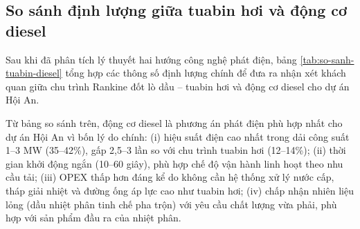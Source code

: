 \documentclass[../main.tex]{subfiles}
\begin{document}
\subsection{So sánh định lượng giữa tuabin hơi và động cơ diesel}
\label{sec:so-sanh-phat-dien}

Sau khi đã phân tích lý thuyết hai hướng công nghệ phát điện, bảng \ref{tab:so-sanh-tuabin-diesel} tổng hợp các thông số định lượng chính để đưa ra nhận xét khách quan giữa chu trình Rankine đốt lò dầu -- tuabin hơi và động cơ diesel cho dự án Hội An.

\begin{table}[H]
\centering
\caption{So sánh định lượng giữa đốt lò dầu -- tuabin hơi và động cơ diesel cho dự án xử lý CTRSH Hội An}
\label{tab:so-sanh-tuabin-diesel}
\setlength{\tabcolsep}{4pt}
\end{table}

Từ bảng so sánh trên, động cơ diesel là phương án phát điện phù hợp nhất cho dự án Hội An vì bốn lý do chính: (i) hiệu suất điện cao nhất trong dải công suất 1--3 MW (35--42\%), gấp 2,5--3 lần so với chu trình tuabin hơi (12--14\%); (ii) thời gian khởi động ngắn (10--60 giây), phù hợp chế độ vận hành linh hoạt theo nhu cầu tải; (iii) OPEX thấp hơn đáng kể do không cần hệ thống xử lý nước cấp, tháp giải nhiệt và đường ống áp lực cao như tuabin hơi; (iv) chấp nhận nhiên liệu lỏng (dầu nhiệt phân tinh chế pha trộn) với yêu cầu chất lượng vừa phải, phù hợp với sản phẩm đầu ra của nhiệt phân.
\end{document}
